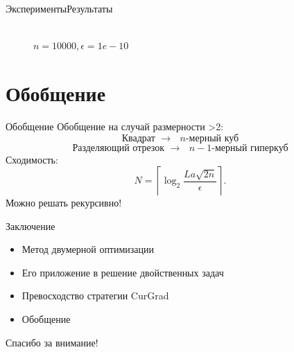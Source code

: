 \documentclass{beamer}
\begin{document}
\begin{frame}{Эксперименты}{Результаты}
\begin{figure}[H]
\begin{minipage}[h]{0.47\linewidth}
\end{minipage}
\hfill
\begin{minipage}[h]{0.47\linewidth}
 \\$n=10000, \epsilon=1e-10$ \\
\end{minipage}
\end{figure}
\end{frame}

\section{Обобщение}

\begin{frame}{Обобщение}
Обобщение на случай размерности >2:
$$\text{Квадрат $\rightarrow$ $n$-мерный куб}$$
$$\text{Разделяющий отрезок $\rightarrow$ $n-1$-мерный гиперкуб}$$
\pause
Сходимость:
\begin{equation}N = \left\lceil\log_2\frac{La\sqrt{2n}}{\epsilon}\right\rceil.\end{equation}
\pause
Можно решать рекурсивно!
\end{frame}

\begin{frame}{Заключение}
\begin{itemize}
\item Метод двумерной оптимизации
\item Его приложение в решение двойственных задач
\item Превосходство стратегии CurGrad
\item Обобщение
\end{itemize}
\end{frame}


\begin{frame}
\center Спасибо за внимание!
\end{frame}
\end{document}
